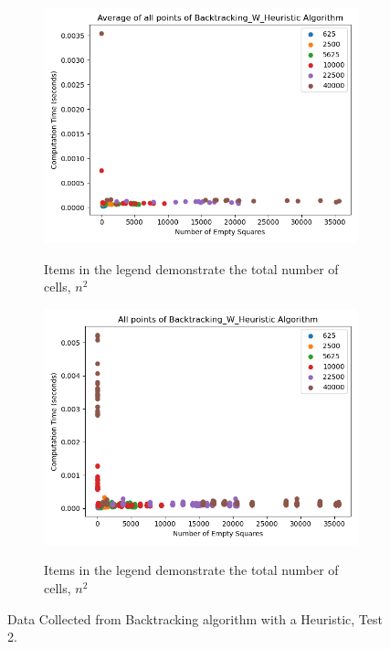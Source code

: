 \documentclass{article}
\begin{document}
\bigskip


\bigskip


\begin{figure}[!h]
	\centering
	\begin{subfigure}{0.4\textwidth}
		\centering
		\includegraphics[scale=0.4]{scatter_avg_Backtracking_w_Heuristic-2.png}
		\label{Test 2: Average of all points}
		\caption{Items in the legend demonstrate the total number of cells, $n^2$}
	\end{subfigure}
	\hfill
	\begin{subfigure}{0.4\textwidth}
		\centering
		\includegraphics[scale=0.4]{scatter_Backtracking_w_Heuristic-2.png}
		\label{Test 2: Scatter plot of all collected points}
		\caption{Items in the legend demonstrate the total number of cells, $n^2$}
	\end{subfigure}
	\caption{Data Collected from Backtracking algorithm with a Heuristic, Test 2.}
\end{figure}
\bigskip
\end{document}
